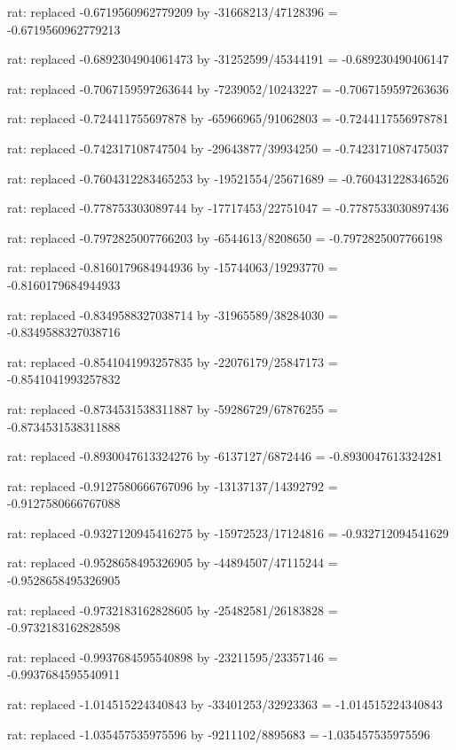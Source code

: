 \documentclass[a4paper,10pt]{article}
\begin{document}
\begin{eulernotebook}
\begin{eulercomment}
\begin{eulercomment}
\begin{eulercomment}
\begin{eulercomment}
\begin{eulercomment}
\begin{eulercomment}
\begin{eulercomment}
\begin{eulercomment}
\begin{eulercomment}
\begin{eulercomment}
\begin{eulercomment}
\begin{eulercomment}
\begin{eulercomment}
\begin{eulercomment}
\begin{eulercomment}
\begin{eulercomment}
\begin{euleroutput}
  rat: replaced -0.6719560962779209 by -31668213/47128396 = -0.6719560962779213
  
  rat: replaced -0.6892304904061473 by -31252599/45344191 = -0.689230490406147
  
  rat: replaced -0.7067159597263644 by -7239052/10243227 = -0.7067159597263636
  
  rat: replaced -0.724411755697878 by -65966965/91062803 = -0.7244117556978781
  
  rat: replaced -0.742317108747504 by -29643877/39934250 = -0.7423171087475037
  
  rat: replaced -0.7604312283465253 by -19521554/25671689 = -0.760431228346526
  
  rat: replaced -0.778753303089744 by -17717453/22751047 = -0.7787533030897436
  
  rat: replaced -0.7972825007766203 by -6544613/8208650 = -0.7972825007766198
  
  rat: replaced -0.8160179684944936 by -15744063/19293770 = -0.8160179684944933
  
  rat: replaced -0.8349588327038714 by -31965589/38284030 = -0.8349588327038716
  
  rat: replaced -0.8541041993257835 by -22076179/25847173 = -0.8541041993257832
  
  rat: replaced -0.8734531538311887 by -59286729/67876255 = -0.8734531538311888
  
  rat: replaced -0.8930047613324276 by -6137127/6872446 = -0.8930047613324281
  
  rat: replaced -0.9127580666767096 by -13137137/14392792 = -0.9127580666767088
  
  rat: replaced -0.9327120945416275 by -15972523/17124816 = -0.932712094541629
  
  rat: replaced -0.9528658495326905 by -44894507/47115244 = -0.9528658495326905
  
  rat: replaced -0.9732183162828605 by -25482581/26183828 = -0.9732183162828598
  
  rat: replaced -0.9937684595540898 by -23211595/23357146 = -0.9937684595540911
  
  rat: replaced -1.014515224340843 by -33401253/32923363 = -1.014515224340843
  
  rat: replaced -1.035457535975596 by -9211102/8895683 = -1.035457535975596
  

\end{euleroutput}
\end{eulercomment}
\end{eulercomment}
\end{eulercomment}
\end{eulercomment}
\end{eulercomment}
\end{eulercomment}
\end{eulercomment}
\end{eulercomment}
\end{eulercomment}
\end{eulercomment}
\end{eulercomment}
\end{eulercomment}
\end{eulercomment}
\end{eulercomment}
\end{eulercomment}
\end{eulercomment}
\end{eulernotebook}
\end{document}
